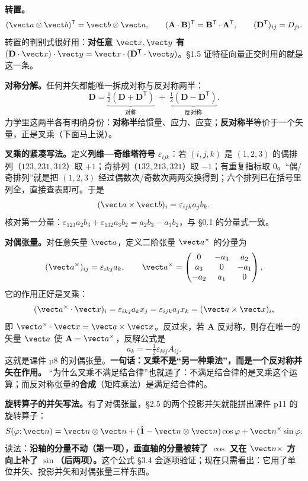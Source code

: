 \documentclass[11pt]{ctexart}
\newcommand{\ten}[1]{\mathbf{#1}}
\newcommand{\unitd}{\hat{\ten{1}}}
\let\origsubhdr\subhdr
\renewcommand{\subhdr}[1]{\par\needspace{3\baselineskip}\origsubhdr{#1}}
\begin{document}

\textbf{转置。}
\[
(\vect a\otimes\vect b)^{\mathsf T}=\vect b\otimes\vect a,
\qquad
(\ten A\cdot\ten B)^{\mathsf T}=\ten B^{\mathsf T}\cdot\ten A^{\mathsf T},
\qquad
(\ten D^{\mathsf T})_{ij}=D_{ji}.
\]
转置的判别式很好用：\textbf{对任意 $\vect x,\vect y$ 有 $(\ten D\cdot\vect x)\cdot\vect y=\vect x\cdot(\ten D^{\mathsf T}\cdot\vect y)$}。§1.5 证特征向量正交时用的就是这一条。

\textbf{对称分解。}任何并矢都能唯一拆成对称与反对称两半：
\[
\ten D=\underbrace{\tfrac12(\ten D+\ten D^{\mathsf T})}_{\text{对称}}\;+\;
\underbrace{\tfrac12(\ten D-\ten D^{\mathsf T})}_{\text{反对称}} .
\]
力学里这两半各有明确身份：\textbf{对称半}给惯量、应力、应变；\textbf{反对称半}等价于一个矢量，正是叉乘（下面马上说）。

\textbf{叉乘的紧凑写法。}定义\textbf{列维—奇维塔符号} $\varepsilon_{ijk}$：若 $(i,j,k)$ 是 $(1,2,3)$ 的偶排列（$123,231,312$）取 $+1$；奇排列（$132,213,321$）取 $-1$；有重复指标取 $0$。“偶/奇排列”就是把 $(1,2,3)$ 经过偶数次/奇数次两两交换得到；六个排列已在括号里列全，直接查表即可。于是
\[
(\vect a\times\vect b)_i=\varepsilon_{ijk}a_jb_k .
\]
核对第一分量：$\varepsilon_{123}a_2b_3+\varepsilon_{132}a_3b_2=a_2b_3-a_3b_2$，与 §0.1 的分量式一致。

\textbf{对偶张量。}对任意矢量 $\vect a$，定义二阶张量 $\vect a^{\times}$ 的分量为
\[
(\vect a^{\times})_{ij}=\varepsilon_{ikj}a_k,
\qquad
\vect a^{\times}=
\begin{pmatrix}
0&-a_3&a_2\\
a_3&0&-a_1\\
-a_2&a_1&0
\end{pmatrix}.
\]
它的作用正好是叉乘：
\[
(\vect a^{\times}\cdot\vect x)_i=\varepsilon_{ikj}a_kx_j=\varepsilon_{ijk}a_jx_k=(\vect a\times\vect x)_i,
\]
即 $\vect a^{\times}\cdot\vect x=\vect a\times\vect x$。反过来，若 $\ten A$ 反对称，则存在唯一的矢量 $\vect a$ 使 $\ten A=\vect a^{\times}$，反解公式是
\[
a_k=-\tfrac12\varepsilon_{kij}A_{ij}.
\]
这就是课件 p8 的对偶张量。\textbf{一句话：叉乘不是“另一种乘法”，而是一个反对称并矢在作用。}
“为什么叉乘不满足结合律”也就通了：不满足结合律的是叉乘这个运算；而反对称张量的\textbf{合成}（矩阵乘法）是满足结合律的。

\textbf{旋转算子的并矢写法。}有了对偶张量，§2.5 的两个投影并矢就能拼出课件 p11 的旋转算子：
\[
S(\varphi;\vect n)=\vect n\otimes\vect n+(\unitd-\vect n\otimes\vect n)\cos\varphi+\vect n^{\times}\sin\varphi .
\]
读法：\textbf{沿轴的分量不动（第一项），垂直轴的分量被转了 $\cos$ 又在 $\vect n\times$ 方向上补了 $\sin$（后两项）。}这个公式 §3.4 会逐项验证；现在只需看出：它用了单位并矢、投影并矢和对偶张量三样东西。
\end{document}
